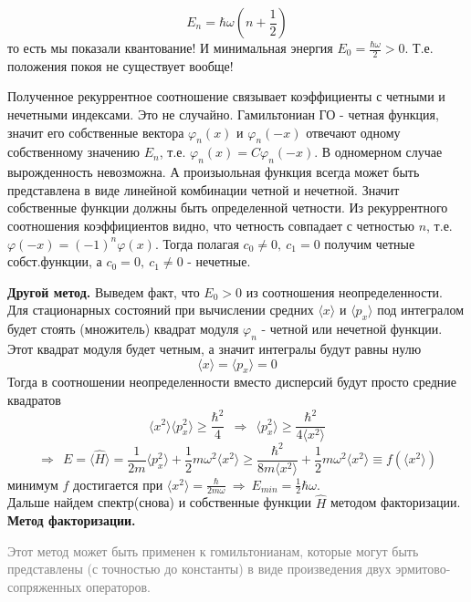 			$$
				E_n = \hbar\omega\left(n + \frac{1}{2}\right)
			$$
			то есть мы показали квантование! И минимальная энергия $E_0 = \frac{\hbar\omega}{2}>0$. Т.е. положения покоя не существует вообще!
			\bigskip
			\begin{scriptsize}
			\begin{spacing}{0.3}
				Полученное рекуррентное соотношение связывает коэффициенты с четными и нечетными индексами. Это не случайно. Гамильтониан ГО - четная функция, значит его собственные вектора $\varphi_n(x)$ и $\varphi_n(-x)$ отвечают одному собственному значению $E_n$, т.е. $\varphi_n(x) = C\varphi_n(-x)$. В одномерном случае вырожденность невозможна. А произыольная функция всегда может быть представлена в виде линейной комбинации четной и нечетной. Значит собственные функции должны быть определенной четности. Из рекуррентного соотношения коэффициентов видно, что четность совпадает с четностью $n$, т.е. $\varphi(-x) = (-1)^n\varphi(x)$. Тогда полагая $c_0 \ne 0, \ c_1 = 0$ получим четные собст.функции, а $c_0=0, \ c_1\ne0$ - нечетные. 
			\end{spacing}
			\end{scriptsize}
			\bigskip
			\textbf{Другой метод.} Выведем факт, что $E_0>0$ из соотношения неопределенности.\\
			Для стационарных состояний при вычислении средних $\langle x \rangle$ и $\langle p_x \rangle$ под интегралом будет стоять (множитель) квадрат модуля $\varphi_n$ - четной или нечетной функции. Этот квадрат модуля будет четным, а значит интегралы будут равны нулю
			$$
				\langle x \rangle = \langle p_x \rangle = 0
			$$
			Тогда в соотношении неопределенности вместо дисперсий будут просто средние квадратов
			$$
				\langle x^2 \rangle \langle p_x^2 \rangle \ge \frac{\hbar^2}{4} \ \ \Rightarrow \ \ \langle p_x^2 \rangle \ge \frac{\hbar^2}{4\langle x^2 \rangle}
			$$ 
			$$
				\Rightarrow \ \ E = \langle \hat{H} \rangle = \frac{1}{2m}\langle p_x^2 \rangle + \frac{1}{2}m\omega^2\langle x^2 \rangle \ge \frac{\hbar^2}{8m\langle x^2 \rangle} + \frac{1}{2}m\omega^2\langle x^2 \rangle \equiv f(\langle x^2 \rangle)
			$$
			минимум $f$ достигается при $\langle x^2 \rangle = \frac{\hbar}{2m\omega} \ \Rightarrow \ E_{min} = \frac{1}{2}\hbar\omega$.\\
			\noindent Дальше найдем спектр(снова) и собственные функции $\hat{H}$ методом факторизации.\\
			\textbf{Метод факторизации.}\\
			\begin{scriptsize}
			\begin{spacing}{0.3}
			\textcolor{gray}{
				Этот метод может быть применен к гомильтонианам, которые могут быть представлены (с точностью до константы) в виде произведения двух эрмитово-сопряженных операторов.
			}	
			\end{spacing}
			\end{scriptsize}
